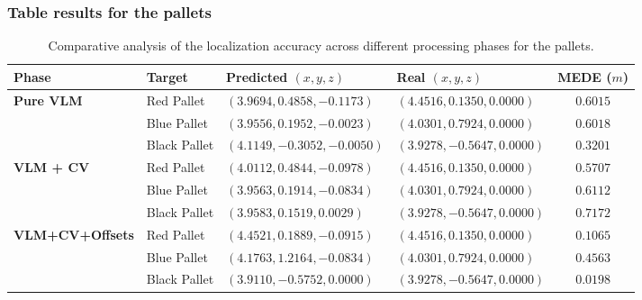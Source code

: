 \subsubsection{Table results for the pallets}
\begin{table}[H]
	\centering
	\small
	\begin{tabularx}{\textwidth}{l l X X c}
		\toprule
		\textbf{Phase} & \textbf{Target} & \textbf{Predicted $(x, y, z)$} & \textbf{Real $(x, y, z)$} & \textbf{MEDE ($m$)} \\
		\midrule
		\textbf{Pure VLM} 
		& Red Pallet   & $(3.9694, 0.4858, -0.1173)$ & $(4.4516, 0.1350, 0.0000)$ & $0.6015$ \\
		& Blue Pallet  & $(3.9556, 0.1952, -0.0023)$ & $(4.0301, 0.7924, 0.0000)$ & $0.6018$ \\
		& Black Pallet & $(4.1149, -0.3052, -0.0050)$ & $(3.9278, -0.5647, 0.0000)$ & $0.3201$ \\
		\midrule
		\textbf{VLM + CV} 
		& Red Pallet   & $(4.0112, 0.4844, -0.0978)$ & $(4.4516, 0.1350, 0.0000)$ & $0.5707$ \\
		& Blue Pallet  & $(3.9563, 0.1914, -0.0834)$ & $(4.0301, 0.7924, 0.0000)$ & $0.6112$ \\
		& Black Pallet & $(3.9583, 0.1519, 0.0029)$  & $(3.9278, -0.5647, 0.0000)$ & $0.7172$ \\
		\midrule
		\textbf{VLM+CV+Offsets} 
		& Red Pallet   & $(4.4521, 0.1889, -0.0915)$ & $(4.4516, 0.1350, 0.0000)$ & $\mathbf{0.1065}$ \\
		& Blue Pallet  & $(4.1763, 1.2164, -0.0834)$ & $(4.0301, 0.7924, 0.0000)$ & $\mathbf{0.4563}$ \\
		& Black Pallet & $(3.9110, -0.5752, 0.0000)$  & $(3.9278, -0.5647, 0.0000)$ & $\mathbf{0.0198}$ \\
		\bottomrule
	\end{tabularx}
	\caption{Comparative analysis of the localization accuracy across different processing phases for the pallets. }
	\label{tab:platform_results}
\end{table}

